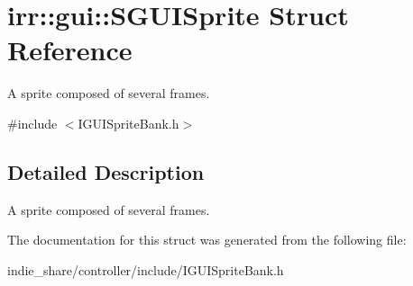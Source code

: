\hypertarget{structirr_1_1gui_1_1SGUISprite}{}\section{irr\+:\+:gui\+:\+:S\+G\+U\+I\+Sprite Struct Reference}
\label{structirr_1_1gui_1_1SGUISprite}


A sprite composed of several frames.  




{\ttfamily \#include $<$I\+G\+U\+I\+Sprite\+Bank.\+h$>$}



\subsection{Detailed Description}
A sprite composed of several frames. 

The documentation for this struct was generated from the following file\+:\begin{DoxyCompactItemize}
\item 
indie\+\_\+share/controller/include/I\+G\+U\+I\+Sprite\+Bank.\+h\end{DoxyCompactItemize}
